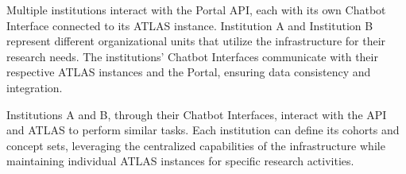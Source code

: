 Multiple institutions interact with the {\ehden} Portal {\ir} API, each with its own Chatbot Interface connected to its ATLAS instance. Institution A and Institution B represent different organizational units that utilize the {\ehden} infrastructure for their research needs. The institutions' Chatbot Interfaces communicate with their respective ATLAS instances and the {\ehden} Portal, ensuring data consistency and integration.

Institutions A and B, through their Chatbot Interfaces, interact with the {\ir} API and ATLAS to perform similar tasks. Each institution can define its cohorts and concept sets, leveraging the centralized capabilities of the {\ehden} infrastructure while maintaining individual ATLAS instances for specific research activities.
